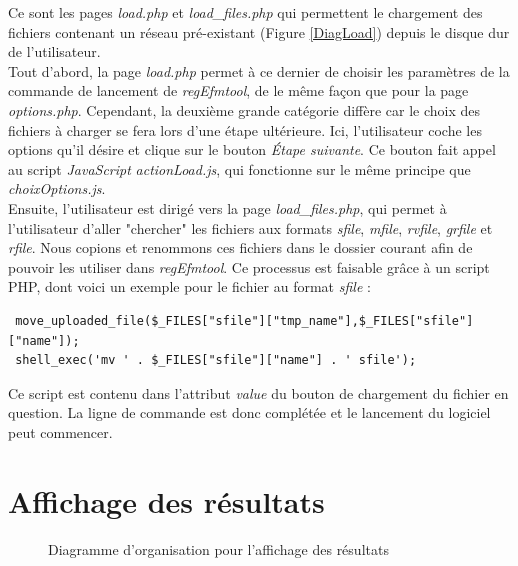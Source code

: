 Ce sont les pages \emph{load.php} et \emph{load\_files.php} qui permettent le chargement des fichiers contenant un réseau pré-existant (Figure \ref{DiagLoad}) depuis le disque dur de l'utilisateur.\\

Tout d'abord, la page \emph{load.php} permet à ce dernier de choisir les paramètres de la commande de lancement de \textit{regEfmtool}, de le même façon que pour la page \emph{options.php}. Cependant, la deuxième grande catégorie diffère car le choix des fichiers à charger se fera lors d'une étape ultérieure. Ici, l'utilisateur coche les options qu'il désire et clique sur le bouton \textit{Étape suivante}. Ce bouton fait appel au script \emph{JavaScript} \emph{actionLoad.js}, qui fonctionne sur le même principe que \emph{choixOptions.js}. \\

Ensuite, l'utilisateur est dirigé vers la page \emph{load\_files.php}, qui permet à l'utilisateur d'aller "chercher" les fichiers aux formats \textit{sfile}, \textit{mfile}, \textit{rvfile}, \textit{grfile} et \textit{rfile}. Nous copions et renommons ces fichiers dans le dossier courant afin de pouvoir les utiliser dans \textit{regEfmtool}. Ce processus est faisable grâce à un  script PHP, dont voici un exemple pour le fichier au format \textit{sfile} :\\

\begin{DDbox}{\linewidth}
\begin{lstlisting}
 move_uploaded_file($_FILES["sfile"]["tmp_name"],$_FILES["sfile"]["name"]);
 shell_exec('mv ' . $_FILES["sfile"]["name"] . ' sfile');
\end{lstlisting}
\end{DDbox}

Ce script est contenu dans l'attribut \textit{value} du bouton de chargement du fichier en question. La ligne de commande est donc complétée et le lancement du logiciel peut commencer. 

\section{Affichage des résultats}

\begin{figure}[!ht]
	\begin{center}
		\caption{Diagramme d'organisation pour l'affichage des résultats}
  		\label{DiagResults}
  	\end{center}	
\end{figure}

